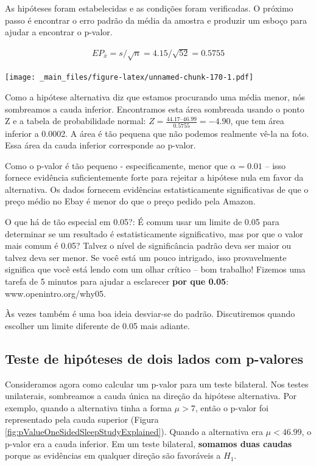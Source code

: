 \documentclass[
]{book}
\theoremstyle{definition}
\theoremstyle{definition}
\theoremstyle{definition}
\theoremstyle{definition}
\theoremstyle{remark}
\begin{document}
As hipóteses foram estabelecidas e as condições foram verificadas. O próximo passo é encontrar o erro padrão da média da amostra e produzir um esboço para ajudar a encontrar o p-valor.

\begin{eqnarray*}
EP_{\bar{x}} = s/\sqrt{n} = 4.15/\sqrt{52} = 0.5755
\end{eqnarray*}

\texttt{[image: \_main\_files/figure-latex/unnamed-chunk-170-1.pdf]}

Como a hipótese alternativa diz que estamos procurando uma média menor, nós sombreamos a cauda inferior. Encontramos esta área sombreada usando o ponto Z e a tabela de probabilidade normal: \(Z = \frac{44.17 – 46.99}{0.5755} = -4.90\), que tem área inferior a 0.0002. A área é tão pequena que não podemos realmente vê-la na foto. Essa área da cauda inferior corresponde ao p-valor.

Como o p-valor é tão pequeno - especificamente, menor que \(\alpha = 0.01\) -- isso fornece evidência suficientemente forte para rejeitar a hipótese nula em favor da alternativa. Os dados fornecem evidências estatisticamente significativas de que o preço médio no Ebay é menor do que o preço pedido pela Amazon.

O que há de tão especial em 0.05?: É comum usar um limite de 0.05 para determinar se um resultado é estatisticamente significativo, mas por que o valor mais comum é 0.05? Talvez o nível de significância padrão deva ser maior ou talvez deva ser menor. Se você está um pouco intrigado, isso provavelmente significa que você está lendo com um olhar crítico -- bom trabalho! Fizemos uma tarefa de 5 minutos para ajudar a esclarecer \textbf{por que 0.05}: www.openintro.org/why05.

Às vezes também é uma boa ideia desviar-se do padrão. Discutiremos quando escolher um limite diferente de 0.05 mais adiante.

\hypertarget{HTTwoSidedPValue}{%
\subsection{Teste de hipóteses de dois lados com p-valores}\label{HTTwoSidedPValue}}

Consideramos agora como calcular um p-valor para um teste bilateral. Nos testes unilaterais, sombreamos a cauda única na direção da hipótese alternativa. Por exemplo, quando a alternativa tinha a forma \(\mu > 7\), então o p-valor foi representado pela cauda superior (Figura \ref{fig:pValueOneSidedSleepStudyExplained}). Quando a alternativa era \(\mu<46.99\), o p-valor era a cauda inferior. Em um teste bilateral, \textbf{somamos duas caudas} porque as evidências em qualquer direção são favoráveis a \(H_1\).
\end{document}
